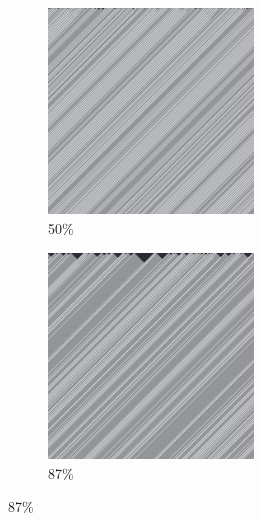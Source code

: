 \documentclass[12pt, fleqn]{report}                             %
\theoremstyle{break}                                            %
\begin{document}
\begin{figure}[ht!]
\begin{subfigure}[b]{0.4\linewidth}
          \includegraphics[width=0.6\textwidth]{Images/58/c.png}
          \caption{50\%}
        \end{subfigure}
        \begin{subfigure}[b]{0.4\linewidth}
          \includegraphics[width=0.6\textwidth]{Images/58/d.png}
          \caption{87\%}
        \end{subfigure}
      \end{figure}
\end{document}
